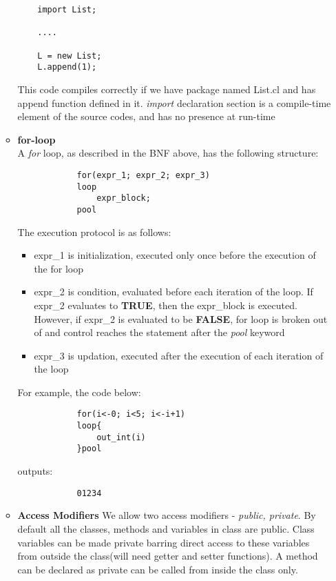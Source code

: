 \documentclass[11pt]{article}
\begin{document}
\begin{enumerate}
\begin{itemize}
    \begin{verbatim}
    import List;
    
    ....
    
    L = new List;
    L.append(1);
\end{verbatim}
This code compiles correctly if we have package named List.cl and has append function defined in it. \textit{import} declaration section is a compile-time element of the source codes, and has no presence at run-time
        
    
        \item \textbf{for-loop}\\
        A \textit{for} loop, as described in the BNF above, has the following structure: 
        \begin{verbatim}
            for(expr_1; expr_2; expr_3)
            loop
                expr_block;
            pool
        \end{verbatim}
        The execution protocol is as follows:\\
        \begin{itemize}
            \item {expr\_1 is initialization, executed only once before the execution of the for loop}
            \item {expr\_2 is condition, evaluated before each iteration of the loop. If expr\_2 evaluates to \textbf{TRUE}, then the expr\_block is executed. However, if expr\_2 is evaluated to be \textbf{FALSE}, for loop is broken out of and control reaches the statement after the \textit{pool} keyword}
            \item{expr\_3 is updation, executed after the execution of each iteration of the loop}
        \end{itemize}
        
        For example, the code below:
        \begin{verbatim}
            for(i<-0; i<5; i<-i+1)
            loop{
                out_int(i)
            }pool
        \end{verbatim}
        outputs:
        \begin{verbatim}
            01234
        \end{verbatim}
        
        
        \item \textbf{Access Modifiers} We allow two access modifiers - \textit{public, private}. By default all the classes, methods and  variables in class are public. Class variables can be made private barring direct access to these variables from outside the class(will need getter and setter functions). A method can be declared as private can be called from inside the class only.
        

\end{itemize}
\end{enumerate}
\end{document}

